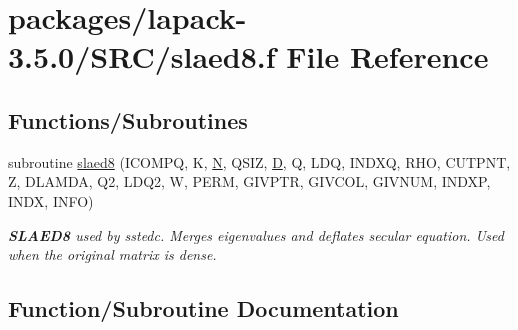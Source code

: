 \hypertarget{slaed8_8f}{}\section{packages/lapack-\/3.5.0/\+S\+R\+C/slaed8.f File Reference}
\label{slaed8_8f}
\subsection*{Functions/\+Subroutines}
\begin{DoxyCompactItemize}
\item 
subroutine \hyperlink{slaed8_8f_a30149642972bca9bd36546329e659246}{slaed8} (I\+C\+O\+M\+P\+Q, K, \hyperlink{polmisc_8c_a0240ac851181b84ac374872dc5434ee4}{N}, Q\+S\+I\+Z, \hyperlink{odrpack_8h_a7dae6ea403d00f3687f24a874e67d139}{D}, Q, L\+D\+Q, I\+N\+D\+X\+Q, R\+H\+O, C\+U\+T\+P\+N\+T, Z, D\+L\+A\+M\+D\+A, Q2, L\+D\+Q2, W, P\+E\+R\+M, G\+I\+V\+P\+T\+R, G\+I\+V\+C\+O\+L, G\+I\+V\+N\+U\+M, I\+N\+D\+X\+P, I\+N\+D\+X, I\+N\+F\+O)
\begin{DoxyCompactList}\small\item\em {\bfseries S\+L\+A\+E\+D8} used by sstedc. Merges eigenvalues and deflates secular equation. Used when the original matrix is dense. \end{DoxyCompactList}\end{DoxyCompactItemize}


\subsection{Function/\+Subroutine Documentation}
\hypertarget{slaed8_8f_a30149642972bca9bd36546329e659246}{}
